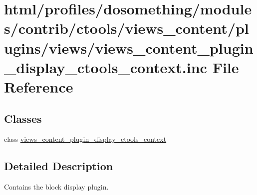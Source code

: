 \hypertarget{views__content__plugin__display__ctools__context_8inc}{
\section{html/profiles/dosomething/modules/contrib/ctools/views\_\-content/plugins/views/views\_\-content\_\-plugin\_\-display\_\-ctools\_\-context.inc File Reference}
\label{views__content__plugin__display__ctools__context_8inc}
}
\subsection*{Classes}
\begin{DoxyCompactItemize}
\item 
class \hyperlink{classviews__content__plugin__display__ctools__context}{views\_\-content\_\-plugin\_\-display\_\-ctools\_\-context}
\end{DoxyCompactItemize}


\subsection{Detailed Description}
Contains the block display plugin. 